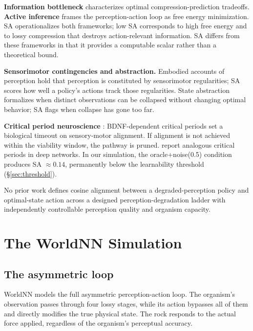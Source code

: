 \documentclass{article}
\begin{document}
\textbf{Information bottleneck} \citep{tishby2000information} characterizes
optimal compression-prediction tradeoffs. \textbf{Active inference}
\citep{friston2010free} frames the perception-action loop as free energy
minimization. SA operationalizes both frameworks; low SA corresponds to high
free energy and to lossy compression that destroys action-relevant information. SA differs from these
frameworks in that it provides a computable scalar rather than a theoretical bound.

\textbf{Sensorimotor contingencies and abstraction.} Embodied accounts of
perception \citep{oregan2001sensorimotor, smith2005development, pfeifer2006body}
hold that perception is constituted by sensorimotor regularities; SA scores
how well a policy's actions track those regularities. State abstraction
\citep{li2006towards} formalizes when distinct observations can be collapsed
without changing optimal behavior; SA flags when collapse has gone too far.

\textbf{Critical period neuroscience} \citep{blakemore1970development,
rossi1999monocular, huang1999bdnf}: BDNF-dependent critical periods set a
biological timeout on sensory-motor alignment. If alignment is not achieved within
the viability window, the pathway is pruned. \citet{achille2019critical}
report analogous critical periods in deep networks. In our simulation, the
oracle+noise(0.5) condition produces SA $\approx 0.14$, permanently below the
learnability threshold (\S\ref{sec:threshold}).

No prior work defines cosine alignment between a degraded-perception policy and
optimal-state action across a designed perception-degradation ladder with
independently controllable perception quality and organism capacity.

\section{The WorldNN Simulation}
\label{sec:simulation}

\subsection{The asymmetric loop}

WorldNN models the full asymmetric perception-action loop. The organism's
observation passes through four lossy stages, while its action bypasses all of
them and directly modifies the true physical state. The rock responds to the
actual force applied, regardless of the organism's perceptual accuracy.
\end{document}

